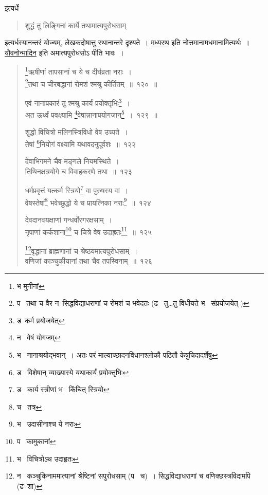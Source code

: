 \documentclass[11pt, openany]{book}
\begin{document}
\noindent
इत्यर्धे\textendash

\begin{quote}
{\qt शुद्धं तु लिङ्गिनां कार्ये तथामात्यपुरोधसाम्}
\end{quote}

इत्यर्धस्यानन्तरं योज्यम्, लेखकदोषात्तु स्थानान्तरे दृश्यते~। \underline{मध्यस्थ} इति नोत्तमानामधमानामित्यर्थः~। \underline{यौवनोन्मादिन} इति अमात्यपुरोधसोऽ पीति भावः~।

\newpage

\begin{quote}
{\na \renewcommand{\thefootnote}{1}\footnote{भ मुनीनां}ऋषीणां तापसानां च ये च दीर्घव्रता नराः~।\\
\renewcommand{\thefootnote}{2}\footnote{प \textendash\ तथा च वैर न\textendash\ सिद्धविद्याधराणां च रोमशं च भवेदतः (ढ \textendash\ तु\ldots तु विधीयते भ \textendash\ संप्रयोजयेत् )}तथा च चीरबद्धानां रोमशं श्मश्रु कीर्तितम्~॥~१२०~॥

एवं नानाप्रकारं तु श्मश्रु कार्यं प्रयोक्तृभिः\renewcommand{\thefootnote}{3}\footnote{ड\textendash\ कर्म प्रयोजयेत्}~।\\
अत ऊर्ध्वं प्रवक्ष्यामि \renewcommand{\thefootnote}{4}\footnote{न \textendash\ वेषं योगजम्}वेषान्नानाप्रयोगजान्\renewcommand{\thefootnote}{5}\footnote{भ \textendash\ नानाश्रयोद्भवान्~। अतः परं माल्याच्छादनविधानश्लोकौ पठितौ केषुचिदादर्शेषु}~।~१२९~॥

शुद्धो विचित्रो मलिनस्त्रिविधो वेष उच्यते~।\\
तेषां \renewcommand{\thefootnote}{6}\footnote{ड \textendash\ विशेषान् व्याख्यास्ये यथाकार्यं प्रयोक्तृभिः}नियोगं वक्ष्यामि यथावदनुपूर्वशः~॥~१२२

देवाभिगमने चैव मङ्गले नियमस्थिते~।\\
तिथिनक्षत्रयोगे च विवाहकरणे तथा~॥~१२३

धर्मप्रवृत्तं यत्कर्म स्त्रियो\renewcommand{\thefootnote}{7}\footnote{ड \textendash\ कार्य स्त्रीणां भ \textendash\ किंचित् स्त्रियो} वा पुरुषस्य वा~।\\
वेषस्तेषां\renewcommand{\thefootnote}{8}\footnote{च \textendash\ तत्र} भवेच्छुद्धो ये च प्रायत्निका नराः\renewcommand{\thefootnote}{9}\footnote{भ \textendash\ उदासीनाश्च ये नराः}~॥~१२४

देवदानवयक्षाणां गन्धर्वोरगरक्षसाम्~।\\
नृपाणां कर्कशानां\renewcommand{\thefootnote}{10}\footnote{प \textendash\ कामुकानां} च चित्रे वेष उदाह्रतः\renewcommand{\thefootnote}{11}\footnote{भ \textendash\ विचित्रोऽथ उदाहृतः}~॥~१२५

\renewcommand{\thefootnote}{12}\footnote{न \textendash\ कञ्चुकिनाममात्यानां श्रेष्टिनां सपुरोधसाम् (प \textendash\ च)~। सिद्धविद्याधराणां च वणिक्छस्त्रविदामपि (ढ\textendash\ शा)}वृद्धानां ब्राह्मणानां च श्रेष्ठयमात्यपुरोधसाम्~।\\
वणिजां काञ्चुकीयानां तथा चैव तपस्विनाम्~॥~१२६}
\end{quote}
\end{document}
